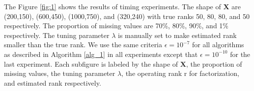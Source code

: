 \documentclass[11pt]{article}
\begin{document}
The Figure \ref{fig:1} shows the results of timing experiments. The shape of $\boldsymbol{X}$ are (200,150), (600,450), (1000,750), and (320,240) with true ranks 50, 80, 80, and 50 respectively. The proportion of missing values are 70\%, 80\%, 90\%, and 1\% respectively. The tuning parameter $\lambda$ is manually set to make estimated rank smaller than the true rank. We use the same criteria $\epsilon = 10^{-7}$ for all algorithms as described in Algorithm \ref{alg_1} in all experiments except that $\epsilon = 10^{-10}$ for the last experiment. Each subfigure is labeled by the shape of $\boldsymbol{X}$, the proportion of missing values, the tuning parameter $\lambda$, the operating rank r for factorization, and estimated rank respectively.
\begin{figure}[ht!]\centering                                                          
	\subfigure[Case 2]{  
		\begin{minipage}{6.6cm}\centering   

\end{minipage}}
\end{figure}
\end{document}
